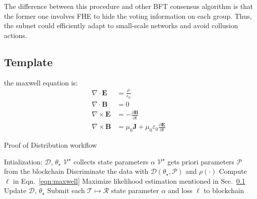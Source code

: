 \documentclass[11pt]{article}
\begin{document}
The difference between this procedure and other BFT consensus algorithm is that the former one involves FHE to hide the voting information on each group.
Thus, the subnet could efficiently adapt to small-scale networks and avoid collusion actions.

\subsection{Template}
\label{sec:template}
the maxwell equation is:
\begin{equation}
  \label{eqn:maxwell}
\begin{aligned}
\nabla\cdot\mathbf{E} &= \frac{\rho}{\varepsilon_0}\\
\nabla\cdot\mathbf{B} &= 0\\
\nabla\times\mathbf{E} &= -\frac{\partial\mathbf{B}}{\partial t}\\
\nabla\times\mathbf{B} &= \mu_0\mathbf{J}+\mu_0\varepsilon_0\frac{\partial\mathbf{E}}{\partial t}
\end{aligned}
\end{equation}
\begin{algorithm}
	\caption{Proof of Distribution workflow}\label{alg:pod}
	\begin{algorithmic}[1]
		\State Intialization: $\mathcal{D}$, $\theta_\star$
			\State $\mathcal{V^\star}$ collects state parameters $\alpha$
			\State $\mathcal{V^\star}$ gets priori parameters $\mathcal{P}$ from the blockchain
			\Repeat 
				\State Discriminate the data with $\mathcal{D}(\theta_\star, \mathcal{P})$ and $\rho(\cdot)$
				\State Compute $\ell$ in Eqn.~\ref{eqn:maxwell}
				\State Maximize likelihood estimation mentioned in Sec.~\ref{sec:template}
				\State Update $\mathcal{D}$, $\theta_\star$
			\Until {$\delta \ell<\theta_\epsilon$}
			\State Submit each $\mathcal{T}\mapsto\mathcal{R}$ state parameter $\alpha$ and loss $\ell$ to blockchain
		\EndFor
	\end{algorithmic}
  \end{algorithm}


\end{document}
